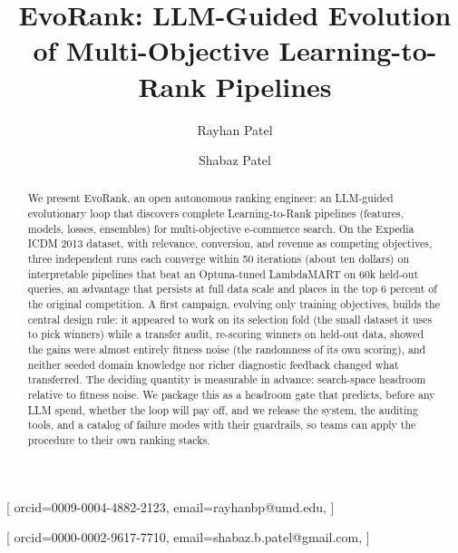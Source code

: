 \documentclass[]{ceurart}
\begin{document}


\title{EvoRank: LLM-Guided Evolution of Multi-Objective Learning-to-Rank Pipelines}
\tnotemark[1]

\author[1]{Rayhan Patel}[%
orcid=0009-0004-4882-2123,
email=rayhanbp@umd.edu,
]
\fnmark[1]
\author[2]{Shabaz Patel}[%
orcid=0000-0002-9617-7710,
email=shabaz.b.patel@gmail.com,
]
\cormark[1]
\fnmark[1]
\address[1]{University of Maryland, College Park, MD, USA}
\address[2]{Independent Researcher}

\begin{abstract}
We present EvoRank, an open autonomous ranking engineer: an LLM-guided
evolutionary loop that discovers complete Learning-to-Rank pipelines
(features, models, losses, ensembles) for multi-objective e-commerce
search. On the Expedia ICDM 2013 dataset, with
relevance, conversion, and revenue as competing objectives, three independent runs each converge within 50 iterations (about ten dollars) on interpretable pipelines
that beat an Optuna-tuned LambdaMART on 60k held-out queries, an advantage that persists at full data scale and places in the top 6
percent of the original competition. A first campaign, evolving only training objectives, builds the central
design rule: it appeared to work on its selection fold (the small dataset it uses to
pick winners) while a transfer audit, re-scoring winners on held-out data,
showed the gains were almost entirely fitness noise (the randomness of its
own scoring), and neither seeded domain knowledge nor richer diagnostic
feedback changed what transferred. The deciding quantity is
measurable in advance: search-space headroom relative to fitness noise. We
package this as a headroom gate that predicts, before any LLM spend, whether
the loop will pay off, and we release the system, the auditing tools, and a catalog of failure
modes with their guardrails, so teams can apply the procedure to their own ranking stacks.
\end{abstract}
\end{document}
